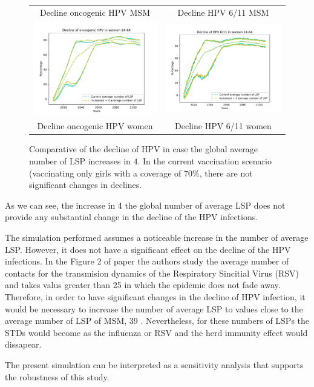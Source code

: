 \begin{figure}[!]
\begin{tabular}{cc}
		Decline oncogenic HPV MSM	& Decline HPV 6/11 MSM \\ 
		\includegraphics[width=0.5\linewidth]{IMGs/12.-Aumento_LSP/onco_muj.pdf}	& 
		\includegraphics[width=0.5\linewidth]{IMGs/12.-Aumento_LSP/verr_muj.pdf}  \\ 
		Decline oncogenic HPV women	& Decline HPV 6/11 women \\ 
	\end{tabular} 
	\caption{Comparative of the decline of HPV in case the global average number of LSP increases in $4$. In the current vaccination scenario (vaccinating only girls with a coverage of $70\%$, there are not significant changes in declines.}
	\label{fig:compara_k}
\end{figure}

As we can see, the increase in 4 the global number of average LSP does not provide any substantial change in the decline of the HPV infections.

The simulation performed assumes a noticeable increase in the number of average LSP. However, it does not have a significant effect on the decline of the HPV infections. In the Figure 2 of paper \cite{acedo2011using} the authors study the average number of contacts for the transmision dynamics of the Respiratory Sincitial Virus (RSV) and takes valus greater than 25 in which the epidemic does not fade away. Therefore, in order to have significant changes in the decline of HPV infection, it would be necessary to increase the number of average LSP to values close to the average number of LSP of MSM, 39 \cite{Durex2002}. Nevertheless, for these numbers of LSPs the STDs would become as the influenza or RSV and the herd immunity effect would dissapear.

The present simulation can be interpreted as a sensitivity analysis that supports the robustness of this study.
